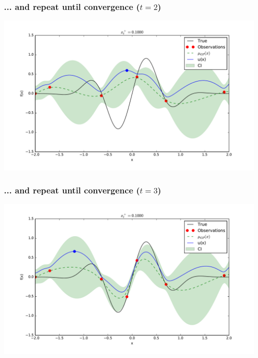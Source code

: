 \documentclass{beamer}
\begin{document}
\begin{frame}
    \frametitle{... and repeat until convergence ($t=2$)}
    \begin{center}
        \includegraphics[width=\textwidth]{code/fig4-2.pdf}
    \end{center}
\end{frame}

\begin{frame}
    \frametitle{... and repeat until convergence ($t=3$)}
    \begin{center}
        \includegraphics[width=\textwidth]{code/fig4-3.pdf}
    \end{center}
\end{frame}
\end{document}
